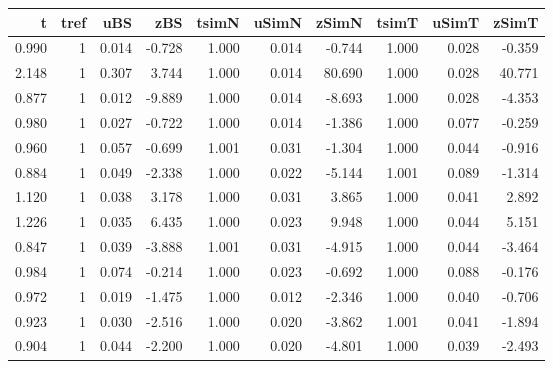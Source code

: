 
\begin{tabular}{r|r|r|r|r|r|r|r|r|r}
\hline
t & tref & uBS & zBS & tsimN & uSimN & zSimN & tsimT & uSimT & zSimT\\
\hline
0.990 & 1 & 0.014 & -0.728 & 1.000 & 0.014 & -0.744 & 1.000 & 0.028 & -0.359\\
\hline
2.148 & 1 & 0.307 & 3.744 & 1.000 & 0.014 & 80.690 & 1.000 & 0.028 & 40.771\\
\hline
0.877 & 1 & 0.012 & -9.889 & 1.000 & 0.014 & -8.693 & 1.000 & 0.028 & -4.353\\
\hline
0.980 & 1 & 0.027 & -0.722 & 1.000 & 0.014 & -1.386 & 1.000 & 0.077 & -0.259\\
\hline
0.960 & 1 & 0.057 & -0.699 & 1.001 & 0.031 & -1.304 & 1.000 & 0.044 & -0.916\\
\hline
0.884 & 1 & 0.049 & -2.338 & 1.000 & 0.022 & -5.144 & 1.001 & 0.089 & -1.314\\
\hline
1.120 & 1 & 0.038 & 3.178 & 1.000 & 0.031 & 3.865 & 1.000 & 0.041 & 2.892\\
\hline
1.226 & 1 & 0.035 & 6.435 & 1.000 & 0.023 & 9.948 & 1.000 & 0.044 & 5.151\\
\hline
0.847 & 1 & 0.039 & -3.888 & 1.001 & 0.031 & -4.915 & 1.000 & 0.044 & -3.464\\
\hline
0.984 & 1 & 0.074 & -0.214 & 1.000 & 0.023 & -0.692 & 1.000 & 0.088 & -0.176\\
\hline
0.972 & 1 & 0.019 & -1.475 & 1.000 & 0.012 & -2.346 & 1.000 & 0.040 & -0.706\\
\hline
0.923 & 1 & 0.030 & -2.516 & 1.000 & 0.020 & -3.862 & 1.001 & 0.041 & -1.894\\
\hline
0.904 & 1 & 0.044 & -2.200 & 1.000 & 0.020 & -4.801 & 1.000 & 0.039 & -2.493\\
\hline
\end{tabular}
